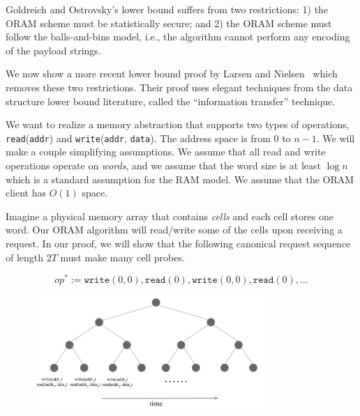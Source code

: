 Goldreich and Ostrovsky's lower bound suffers from two restrictions:
1) the ORAM scheme must be statistically secure; and 2) 
the ORAM scheme must follow the balls-and-bins model, i.e.,
the algorithm cannot perform any encoding of the payload strings.

We now 
show a more recent lower bound proof 
by Larsen  
and Nielsen~\cite{larsen18lowerbound} which removes these two restrictions.
Their proof uses elegant 
techniques from the data structure lower bound literature,
called the ``information transfer'' technique.



We want to realize a memory abstraction
that supports two types of operations, 
\texttt{read}(\texttt{addr}) and \texttt{write}(\texttt{addr}, \texttt{data}).
The address space is from $0$ to $n-1$.
We will make a couple simplifying assumptions. 
We assume that all read and write operations
operate on {\it words}, and we assume 
that the word size is at least $\log n$ which is a standard
assumption for the RAM model.
We assume that the ORAM client has $O(1)$ space. 

Imagine a physical memory array that contains {\it cells}
and each cell stores one word. 
Our ORAM algorithm 
will read/write  
some of the cells upon receiving a request.
In our proof, we will show that the following canonical 
request sequence of length $2T$ 
must make many cell probes.

\[op^* := \texttt{write}(0, {0}), \texttt{read}(0), 
\texttt{write}(0, {0}), \texttt{read}(0), \ldots\]

\begin{figure}[t]
\centering
\includegraphics[width=0.8\textwidth]{lntree}
\end{figure}


